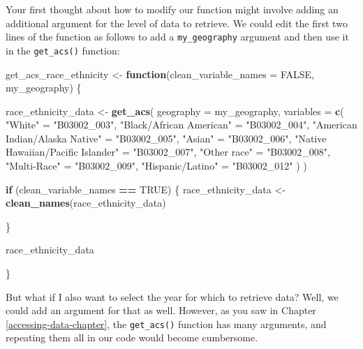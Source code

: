 \documentclass[
]{book}
\newenvironment{Shaded}{\begin{snugshade}}{\end{snugshade}}
\newcommand{\AttributeTok}[1]{\textcolor[rgb]{0.13,0.29,0.53}{#1}}
\newcommand{\ConstantTok}[1]{\textcolor[rgb]{0.56,0.35,0.01}{#1}}
\newcommand{\ControlFlowTok}[1]{\textcolor[rgb]{0.13,0.29,0.53}{\textbf{#1}}}
\newcommand{\FunctionTok}[1]{\textcolor[rgb]{0.13,0.29,0.53}{\textbf{#1}}}
\newcommand{\NormalTok}[1]{#1}
\newcommand{\OtherTok}[1]{\textcolor[rgb]{0.56,0.35,0.01}{#1}}
\newcommand{\SpecialCharTok}[1]{\textcolor[rgb]{0.81,0.36,0.00}{\textbf{#1}}}
\newcommand{\StringTok}[1]{\textcolor[rgb]{0.31,0.60,0.02}{#1}}
\begin{document}
Your first thought about how to modify our function might involve adding an additional argument for the level of data to retrieve. We could edit the first two lines of the function as follows to add a \texttt{my\_geography} argument and then use it in the \texttt{get\_acs()} function:

\begin{Shaded}
\begin{Highlighting}[]
\NormalTok{get\_acs\_race\_ethnicity }\OtherTok{\textless{}{-}} \ControlFlowTok{function}\NormalTok{(}\AttributeTok{clean\_variable\_names =} \ConstantTok{FALSE}\NormalTok{,}
\NormalTok{                                   my\_geography) \{}
  
\NormalTok{  race\_ethnicity\_data }\OtherTok{\textless{}{-}}
    \FunctionTok{get\_acs}\NormalTok{(}
      \AttributeTok{geography =}\NormalTok{ my\_geography,}
      \AttributeTok{variables =} \FunctionTok{c}\NormalTok{(}
        \StringTok{"White"} \OtherTok{=} \StringTok{"B03002\_003"}\NormalTok{,}
        \StringTok{"Black/African American"} \OtherTok{=} \StringTok{"B03002\_004"}\NormalTok{,}
        \StringTok{"American Indian/Alaska Native"} \OtherTok{=} \StringTok{"B03002\_005"}\NormalTok{,}
        \StringTok{"Asian"} \OtherTok{=} \StringTok{"B03002\_006"}\NormalTok{,}
        \StringTok{"Native Hawaiian/Pacific Islander"} \OtherTok{=} \StringTok{"B03002\_007"}\NormalTok{,}
        \StringTok{"Other race"} \OtherTok{=} \StringTok{"B03002\_008"}\NormalTok{,}
        \StringTok{"Multi{-}Race"} \OtherTok{=} \StringTok{"B03002\_009"}\NormalTok{,}
        \StringTok{"Hispanic/Latino"} \OtherTok{=} \StringTok{"B03002\_012"}
\NormalTok{      )}
\NormalTok{    )}
  
  \ControlFlowTok{if}\NormalTok{ (clean\_variable\_names }\SpecialCharTok{==} \ConstantTok{TRUE}\NormalTok{) \{}
\NormalTok{    race\_ethnicity\_data }\OtherTok{\textless{}{-}} \FunctionTok{clean\_names}\NormalTok{(race\_ethnicity\_data)}
    
\NormalTok{  \}}
  
\NormalTok{  race\_ethnicity\_data}
  
\NormalTok{\}}
\end{Highlighting}
\end{Shaded}

But what if I also want to select the year for which to retrieve data? Well, we could add an argument for that as well. However, as you saw in Chapter \ref{accessing-data-chapter}, the \texttt{get\_acs()} function has many arguments, and repeating them all in our code would become cumbersome.
\end{document}
